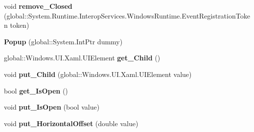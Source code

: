 \begin{DoxyCompactItemize}
\item 
\mbox{\label{class_windows_1_1_u_i_1_1_xaml_1_1_controls_1_1_primitives_1_1_popup_a6296c37154aa1e45ab4075199c3672ed}} 
void {\bfseries remove\+\_\+\+Closed} (global\+::\+System.\+Runtime.\+Interop\+Services.\+Windows\+Runtime.\+Event\+Registration\+Token token)
\item 
\mbox{\label{class_windows_1_1_u_i_1_1_xaml_1_1_controls_1_1_primitives_1_1_popup_a4eb29b9974f43030c2c16d2c04ff7121}} 
{\bfseries Popup} (global\+::\+System.\+Int\+Ptr dummy)
\item 
\mbox{\label{class_windows_1_1_u_i_1_1_xaml_1_1_controls_1_1_primitives_1_1_popup_ae0a14f98eaf6c2db22f78c0eb540c36f}} 
global\+::\+Windows.\+U\+I.\+Xaml.\+U\+I\+Element {\bfseries get\+\_\+\+Child} ()
\item 
\mbox{\label{class_windows_1_1_u_i_1_1_xaml_1_1_controls_1_1_primitives_1_1_popup_a59a124fba4b518e1cbd3eb75d64476cf}} 
void {\bfseries put\+\_\+\+Child} (global\+::\+Windows.\+U\+I.\+Xaml.\+U\+I\+Element value)
\item 
\mbox{\label{class_windows_1_1_u_i_1_1_xaml_1_1_controls_1_1_primitives_1_1_popup_a5a40e3cb4731adefc4b10d02ddf2f333}} 
bool {\bfseries get\+\_\+\+Is\+Open} ()
\item 
\mbox{\label{class_windows_1_1_u_i_1_1_xaml_1_1_controls_1_1_primitives_1_1_popup_a00b5ecaf18b7393169b9e446d9047b66}} 
void {\bfseries put\+\_\+\+Is\+Open} (bool value)
\item 
\mbox{\label{class_windows_1_1_u_i_1_1_xaml_1_1_controls_1_1_primitives_1_1_popup_aeca30f18059cce5584174e60642efeb4}} 
void {\bfseries put\+\_\+\+Horizontal\+Offset} (double value)
\item 
\mbox{\label{class_windows_1_1_u_i_1_1_xaml_1_1_controls_1_1_primitives_1_1_popup_ae5934841bb34664eff76c0d774136250}} 

\end{DoxyCompactItemize}
